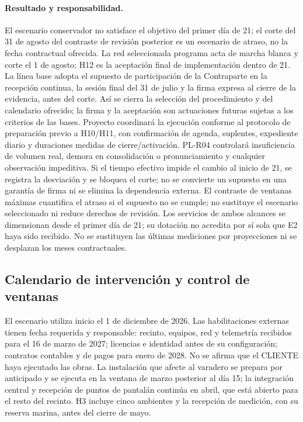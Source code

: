 \paragraph{Resultado y responsabilidad.} El escenario conservador no satisface el objetivo del primer día de 21; el corte del 31 de agosto del contraste de revisión posterior es un escenario de atraso, no la fecha contractual ofrecida. La red seleccionada programa acta de marcha blanca y corte el 1 de agosto; H12 es la aceptación final de implementación dentro de 21. La línea base adopta el supuesto de participación de la Contraparte en la recepción continua, la sesión final del 31 de julio y la firma expresa al cierre de la evidencia, antes del corte. Así se cierra la selección del procedimiento y del calendario ofrecido; la firma y la aceptación son actuaciones futuras sujetas a los criterios de las bases. Proyecto coordinará la ejecución conforme al protocolo de preparación previo a H10/H11, con confirmación de agenda, suplentes, expediente diario y duraciones medidas de cierre/activación. PL-R04 controlará insuficiencia de volumen real, demora en consolidación o pronunciamiento y cualquier observación impeditiva. Si el tiempo efectivo impide el cambio al inicio de 21, se registra la desviación y se bloquea el corte; no se convierte un supuesto en una garantía de firma ni se elimina la dependencia externa. El contraste de ventanas máximas cuantifica el atraso si el supuesto no se cumple; no sustituye el escenario seleccionado ni reduce derechos de revisión. Los servicios de ambos alcances se dimensionan desde el primer día de 21; su dotación no acredita por sí sola que E2 haya sido recibido. No se sustituyen las últimas mediciones por proyecciones ni se desplazan los meses contractuales.~\parencite[arts.~17--18; pp.~12--13]{bases-admin}




\subsection{Calendario de intervención y control de ventanas} %
El escenario utiliza inicio el 1 de diciembre de 2026. Las habilitaciones externas tienen fecha requerida y responsable: recinto, equipos, red y telemetría recibidos para el 16 de marzo de 2027; licencias e identidad antes de su configuración; contratos contables y de pagos para enero de 2028. No se afirma que el CLIENTE haya ejecutado las obras. La instalación que afecte al varadero se prepara por anticipado y se ejecuta en la ventana de marzo posterior al día 15; la integración central y recepción de puntos de pantalán continúa en abril, que está abierto para el resto del recinto. H3 incluye cinco ambientes y la recepción de medición, con su reserva marina, antes del cierre de mayo.

